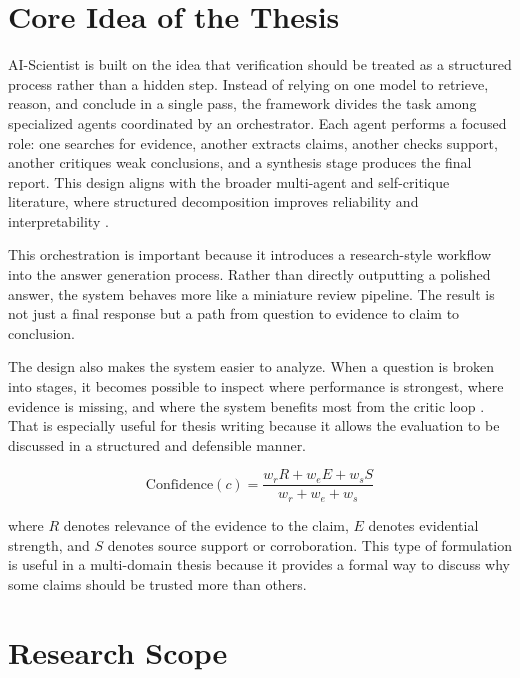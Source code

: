 \section{Core Idea of the Thesis}

AI-Scientist is built on the idea that verification should be treated as a structured process rather than a hidden step. Instead of relying on one model to retrieve, reason, and conclude in a single pass, the framework divides the task among specialized agents coordinated by an orchestrator. Each agent performs a focused role: one searches for evidence, another extracts claims, another checks support, another critiques weak conclusions, and a synthesis stage produces the final report.
This design aligns with the broader multi-agent and self-critique literature, where structured decomposition improves reliability and interpretability \cite{wu2023autogen,li2023camel,shinn2023reflexion}.

This orchestration is important because it introduces a research-style workflow into the answer generation process. Rather than directly outputting a polished answer, the system behaves more like a miniature review pipeline. The result is not just a final response but a path from question to evidence to claim to conclusion.

The design also makes the system easier to analyze. When a question is broken into stages, it becomes possible to inspect where performance is strongest, where evidence is missing, and where the system benefits most from the critic loop \cite{yao2023treeofthoughts,shinn2023reflexion,wu2023autogen,du2023debate}. That is especially useful for thesis writing because it allows the evaluation to be discussed in a structured and defensible manner.

\begin{equation}
\mathrm{Confidence}(c) = \frac{w_r R + w_e E + w_s S}{w_r + w_e + w_s}
\end{equation}

where $R$ denotes relevance of the evidence to the claim, $E$ denotes evidential strength, and $S$ denotes source support or corroboration. This type of formulation is useful in a multi-domain thesis because it provides a formal way to discuss why some claims should be trusted more than others.

\section{Research Scope}

